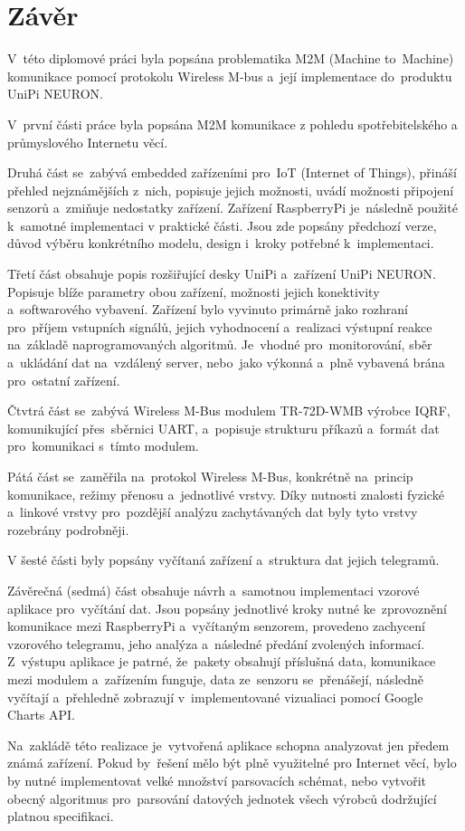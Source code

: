 \chapter{Závěr}

V~této diplomové práci byla popsána problematika M2M (Machine to~Machine) komunikace pomocí protokolu Wireless M-bus a~její implementace do~produktu UniPi NEURON.


V~první části práce byla popsána M2M komunikace z pohledu spotřebitelského a průmyslového Internetu věcí.

Druhá část se~zabývá embedded zařízeními pro~IoT (Internet of Things), přináší přehled nejznámějších z~nich, popisuje jejich možnosti, uvádí možnosti připojení senzorů a~zmiňuje nedostatky zařízení. Zařízení RaspberryPi je~následně použité k~samotné implementaci v praktické části. Jsou zde popsány předchozí verze, důvod výběru konkrétního modelu, design i~kroky potřebné k~implementaci.

Třetí část obsahuje popis rozšiřující desky UniPi a~zařízení UniPi NEURON. Popisuje blíže parametry obou zařízení, možnosti jejich konektivity a~softwarového vybavení. Zařízení bylo vyvinuto primárně jako rozhraní pro~příjem vstupních signálů, jejich vyhodnocení a~realizaci výstupní reakce na~základě naprogramovaných algoritmů. Je~vhodné pro~monitorování, sběr a~ukládání dat na~vzdálený server, nebo~jako výkonná a~plně vybavená brána pro~ostatní zařízení.

Čtvtrá část se~zabývá Wireless M-Bus modulem TR-72D-WMB výrobce IQRF, komunikující přes~sběrnici UART, a~popisuje strukturu příkazů a~formát dat pro~komunikaci s~tímto modulem.

Pátá část se~zaměřila na~protokol Wireless M-Bus, konkrétně na~princip komunikace, režimy přenosu a~jednotlivé vrstvy. 
Díky nutnosti znalosti fyzické a~linkové vrstvy pro~pozdější analýzu zachytávaných dat byly tyto vrstvy rozebrány podrobněji. 

V šesté části byly popsány vyčítaná zařízení a~struktura dat jejich telegramů.

Závěrečná (sedmá) část obsahuje návrh a~samotnou implementaci vzorové aplikace pro~vyčítání dat. Jsou popsány jednotlivé kroky nutné ke~zprovoznění komunikace mezi RaspberryPi a~vyčítaným senzorem, provedeno zachycení vzorového telegramu, jeho analýza a~následné předání zvolených informací. Z~výstupu aplikace je patrné, že~pakety obsahují příslušná data, komunikace mezi modulem a~zařízením funguje, data ze~senzoru se~přenášejí, následně vyčítají a~přehledně zobrazují v~implementované vizualiaci pomocí Google Charts API.

Na~zakládě této realizace je~vytvořená aplikace schopna analyzovat jen předem známá zařízení. Pokud by~řešení mělo být plně využitelné pro Internet věcí, bylo by nutné implementovat velké množství parsovacích schémat, nebo vytvořit obecný algoritmus pro~parsování datových jednotek všech výrobců dodržující platnou specifikaci.


